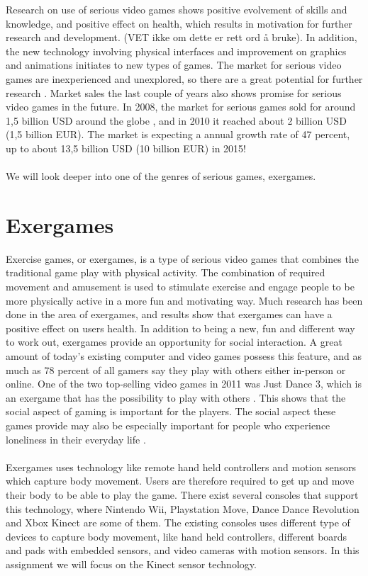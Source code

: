Research on use of serious video games shows positive evolvement of skills and knowledge, and positive effect on health, which results in motivation for further research and development. (VET ikke om dette er rett ord å bruke). In addition, the new technology involving physical interfaces and improvement on graphics and animations initiates to new types of games. The market for serious video games are inexperienced and unexplored, so there are a great potential for further research \cite{alfingewang}. Market sales the last couple of years also shows promise for serious video games in the future. In 2008, the market for serious games sold for around 1,5 billion USD around the globe \cite{alfingewang}, and in 2010 it reached about 2 billion USD (1,5 billion EUR). The market is expecting a annual growth rate of 47 percent, up to about 13,5 billion USD (10 billion EUR) in 2015! \cite{idate} \\ \\
We will look deeper into one of the genres of serious games, exergames.  
\section{Exergames}
Exercise games, or exergames, is a type of serious video games that combines the traditional game play with physical activity. The combination of required movement and amusement is used to stimulate exercise and engage people to be more physically active in a more fun and motivating way. Much research has been done in the area of exergames, and results show that exergames can have a positive effect on users health. In addition to being a new, fun and different way to work out, exergames provide an opportunity for social interaction. A great amount of today’s existing computer and video games possess this feature, and as much as 78 percent of all gamers say they play with others either in-person or online. One of the two top-selling video games in 2011 was Just Dance 3, which is an exergame that has the possibility to play with others \cite{statistics2012}. This shows that the social aspect of gaming is important for the players. The social aspect these games provide may also be especially important for people who experience loneliness in their everyday life \cite{project}.\\ \\
Exergames uses technology like remote hand held controllers and motion sensors which capture body movement. Users are therefore required to get up and move their body to be able to play the game. There exist several consoles that support this technology, where Nintendo Wii, Playstation Move, Dance Dance Revolution and Xbox Kinect are some of them. The existing consoles uses different type of devices to capture body movement, like hand held controllers, different boards and pads with embedded sensors, and video cameras with motion sensors. In this assignment we will focus on the Kinect sensor technology. 
